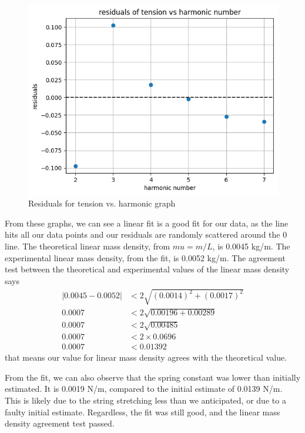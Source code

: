 \documentclass[11pt]{article}
\begin{document}
    \begin{figure}[H]
        \includegraphics[width=1\textwidth]{resources/images/p2 measured tension residuals}
        \caption{Residuals for tension vs. harmonic graph}
        \label{fig:measured_tension_residuals}
    \end{figure}

    From these graphs, we can see a linear fit is a good fit for our data, as the line hits all our data points and our residuals are randomly scattered around the 0 line.
    The theoretical linear mass density, from $mu = m / L$, is 0.0045  kg/m.
    The experimental linear mass density, from the fit, is 0.0052  kg/m.
    The agreement test between the theoretical and experimental values of the linear mass density says
    \begin{align*}
        |0.0045 - 0.0052| &< 2 \sqrt{(0.0014)^2 + (0.0017)^2} \\
        0.0007 &< 2 \sqrt{0.00196 + 0.00289} \\
        0.0007 &< 2 \sqrt{0.00485} \\
        0.0007 &< 2 \times 0.0696 \\
        0.0007 &< 0.01392
    \end{align*}
    that means our value for linear mass density agrees with the theoretical value.

    From the fit, we can also observe that the spring constant was lower than initially estimated.
    It is 0.0019 N/m, compared to the initial estimate of 0.0139 N/m.
    This is likely due to the string stretching less than we anticipated, or due to a faulty initial estimate.
    Regardless, the fit was still good, and the linear mass density agreement test passed.
\end{document}
